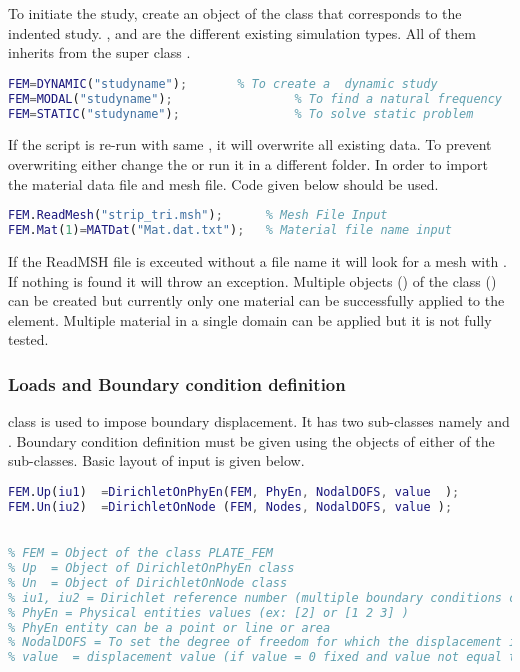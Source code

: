 \documentclass[main.tex]{subfiles}
\begin{document}
To initiate the study, create an object of the class that corresponds to the indented study. ,  and  are the different existing simulation types. All of them inherits from the super class . 
\begin{lstlisting}[language=matlab]
FEM=DYNAMIC("studyname");	    % To create a  dynamic study
FEM=MODAL("studyname");	                % To find a natural frequency
FEM=STATIC("studyname");	            % To solve static problem
\end{lstlisting}
If the script is re-run with same , it will overwrite all existing data. To prevent overwriting either change the  or run it in a different folder. In order to import the material data file and mesh file. Code given below should be used.
\begin{lstlisting}[language=matlab]
FEM.ReadMesh("strip_tri.msh");      % Mesh File Input
FEM.Mat(1)=MATDat("Mat.dat.txt");   % Material file name input
\end{lstlisting}
If the ReadMSH file is exceuted without a file name it will look for a mesh with . If nothing is found it will throw an exception.
Multiple objects () of the class () can be created but currently only one material can be successfully applied to the element. Multiple material in a single domain can be applied but it is not fully tested. 

\subsubsection{Loads and Boundary condition definition}

 class is used to impose boundary displacement. It has two sub-classes namely  and . Boundary condition definition must be given using the objects of either of the sub-classes. Basic layout of input is given below.
\begin{lstlisting}[language=matlab]
FEM.Up(iu1)  =DirichletOnPhyEn(FEM, PhyEn, NodalDOFS, value  );
FEM.Un(iu2)  =DirichletOnNode (FEM, Nodes, NodalDOFS, value );

   
% FEM = Object of the class PLATE_FEM 
% Up  = Object of DirichletOnPhyEn class 
% Un  = Object of DirichletOnNode class 
% iu1, iu2 = Dirichlet reference number (multiple boundary conditions can be applied for same study)
% PhyEn = Physical entities values (ex: [2] or [1 2 3] )
% PhyEn entity can be a point or line or area
% NodalDOFS = To set the degree of freedom for which the displacement is imposed ( ex:[1 0 0] Dirichlet specially on w displacement)
% value  = displacement value (if value = 0 fixed and value not equal to 0 means imposed displacement) 
\end{lstlisting}
\end{document}
